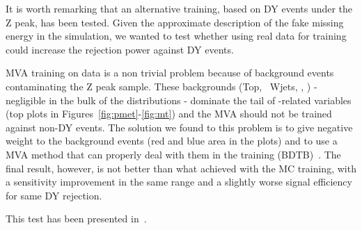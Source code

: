 It is worth remarking that an alternative training, based on DY events under the Z peak, has been tested. 
Given the approximate description of the fake missing energy in the simulation, we wanted to test whether using real data 
for training could increase the rejection power against DY events.

MVA training on data is a non trivial problem because of background events contaminating the Z peak sample. 
These backgrounds (Top, \W\W\, Wjets, \W\Z, \Z\Z) - negligible in the bulk of the distributions - dominate the tail of \met-related variables 
(top plots in Figures~\ref{fig:pmet}-\ref{fig:mt}) and the MVA should not be trained against non-DY events. 
The solution we found to this problem is to give negative weight to the background events (red and blue area in the plots) and to use a MVA method that can 
properly deal with them in the training (BDTB)~\cite{TMVA2007}. 
The final result, however, is not better than what achieved with the MC training, with a sensitivity improvement in the same range and a slightly worse signal efficiency 
for same DY rejection.

This test has been presented in~\cite{ref:dymvadata}. 

